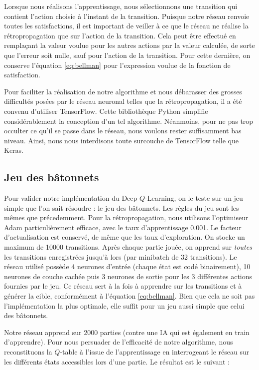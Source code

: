 Lorsque nous réalisons l'apprentissage, nous sélectionnons une transition qui contient l'action choisie à l'instant de la transition. Puisque notre réseau renvoie
toutes les satisfactions, il est important de veiller à ce que le réseau ne réalise la rétropropagation que sur l'action de la transition. Cela peut être 
effectué en remplaçant la valeur voulue pour les autres actions par la valeur calculée, de sorte que l'erreur soit nulle, sauf pour l'action de la transition.
Pour cette dernière, on conserve l'équation \ref{eq:bellman} pour l'expression voulue de la fonction de satisfaction.

Pour faciliter la réalisation de notre algorithme et nous débarasser des grosses difficultés posées par le réseau neuronal telles que la rétropropagation, il 
a été convenu d'utiliser TensorFlow. Cette bibliothèque Python simplifie considérablement la conception d'un tel algorithme. Néanmoins, pour ne pas trop occulter 
ce qu'il se passe dans le réseau, nous voulons rester suffisamment bas niveau. Ainsi, nous nous interdisons toute surcouche de TensorFlow telle que Keras.


\subsection{Jeu des bâtonnets}

Pour valider notre implémentation du Deep $Q$-Learning, on le teste sur un jeu simple que l'on sait résoudre : le jeu des bâtonnets. Les règles du jeu sont les mêmes 
que précedemment. Pour la rétropropagation, nous utilisons l'optimiseur Adam particulièrement efficace, avec le taux d'apprentissage 0.001. Le facteur d'actualisation
est conservé, de même que les taux d'exploration. On stocke un maximum de 10000 transitions. Après chaque partie jouée, on apprend sur \emph{toutes} les transitions
enregistrées jusqu'à lors (par minibatch de 32 transitions). Le réseau utilisé possède 4 neurones d'entrée (chaque état est codé binairement), 10 neurones de couche cachée
puis 3 neurones de sortie pour les 3 différentes actions fournies par le jeu. Ce réseau sert à la fois à apprendre sur les transitions et à générer la cible, 
conformément à l'équation \ref{eq:bellman}. Bien que cela ne soit pas l'implémentation la plus optimale, elle suffit pour un jeu aussi simple que celui des bâtonnets.

Notre réseau apprend sur 2000 parties (contre une IA qui est également en train d'apprendre). Pour nous persuader de l'efficacité de notre algorithme, nous reconstituons
la $Q$-table à l'issue de l'apprentissage en interrogeant le réseau sur les différents états accessibles lors d'une partie. Le résultat est le suivant :

